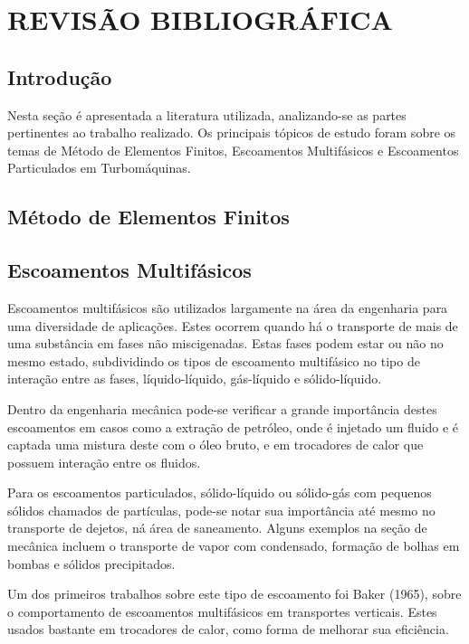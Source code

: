 \chapter{REVISÃO BIBLIOGRÁFICA}
\label{rev_bib}
\section{\textbf{Introdução}}
Nesta seção é apresentada a literatura utilizada, analizando-se as partes pertinentes ao trabalho realizado. Os principais tópicos de estudo foram sobre os temas de Método de Elementos Finitos, Escoamentos Multifásicos e Escoamentos Particulados em Turbomáquinas. 

\section{\textbf{Método de Elementos Finitos}}


\section{\textbf{Escoamentos Multifásicos}}
Escoamentos multifásicos são utilizados largamente na área da engenharia para uma diversidade de aplicações.
Estes ocorrem quando há o transporte de mais de uma substância em fases não miscigenadas.
Estas fases podem estar ou não no mesmo estado, subdividindo os tipos de escoamento multifásico no tipo de interação entre as fases, líquido-líquido, gás-líquido e sólido-líquido.

Dentro da engenharia mecânica pode-se verificar a grande importância destes escoamentos em casos como a extração de petróleo, onde é injetado um fluido e é captada uma mistura deste com o óleo bruto, e em trocadores de calor que possuem interação entre os fluidos.

Para os escoamentos particulados, sólido-líquido ou sólido-gás com pequenos sólidos chamados de partículas, pode-se notar sua importância até mesmo no transporte de dejetos, ná área de saneamento.%
Alguns exemplos na seção de mecânica incluem o transporte de vapor com condensado, formação de bolhas em bombas e sólidos precipitados.

Um dos primeiros trabalhos sobre este tipo de escoamento foi Baker (1965)\cite{Baker-1965}, sobre o comportamento de escoamentos multifásicos em transportes verticais.
Estes usados bastante em trocadores de calor, como forma de melhorar sua eficiência.

